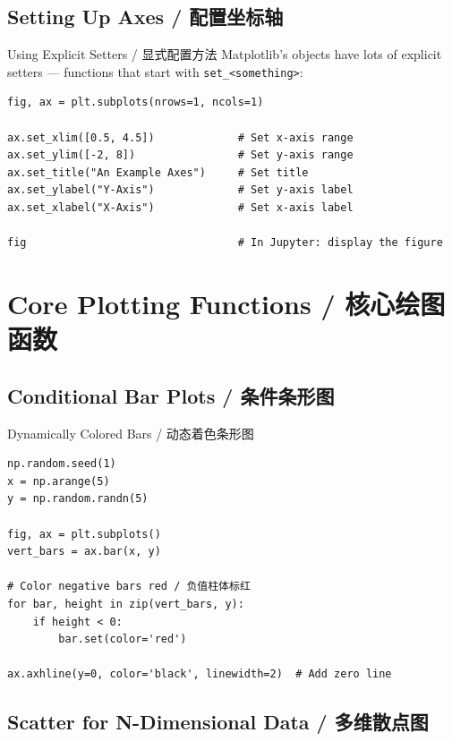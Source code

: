 \documentclass[11pt,a4paper]{report}
\let\oldtexttt\texttt
\renewcommand{\texttt}[1]{\textcolor{mainblue}{\oldtexttt{#1}}}
\begin{document}
\subsection{Setting Up Axes / 配置坐标轴}

\begin{examplebox}{Using Explicit Setters / 显式配置方法}
    Matplotlib's objects have lots of explicit setters — functions that start with \texttt{set\_<something>}:
\begin{lstlisting}
fig, ax = plt.subplots(nrows=1, ncols=1)

ax.set_xlim([0.5, 4.5])             # Set x-axis range
ax.set_ylim([-2, 8])                # Set y-axis range
ax.set_title("An Example Axes")     # Set title
ax.set_ylabel("Y-Axis")             # Set y-axis label
ax.set_xlabel("X-Axis")             # Set x-axis label

fig                                 # In Jupyter: display the figure
\end{lstlisting}
\end{examplebox}

\section{Core Plotting Functions / 核心绘图函数}

\subsection{Conditional Bar Plots / 条件条形图}

\begin{examplebox}{Dynamically Colored Bars / 动态着色条形图}
\begin{lstlisting}
np.random.seed(1)
x = np.arange(5)
y = np.random.randn(5)

fig, ax = plt.subplots()
vert_bars = ax.bar(x, y)

# Color negative bars red / 负值柱体标红
for bar, height in zip(vert_bars, y):
    if height < 0:
        bar.set(color='red')

ax.axhline(y=0, color='black', linewidth=2)  # Add zero line
\end{lstlisting}
\end{examplebox}

\subsection{Scatter for N-Dimensional Data / 多维散点图}
\end{document}
